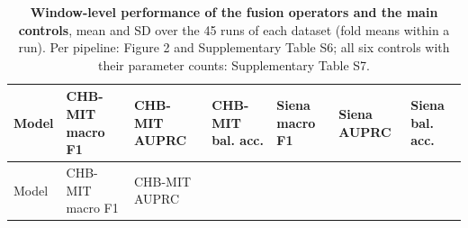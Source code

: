 \documentclass[11pt,a4paper]{article}
\begin{document}
\begin{longtable}[]{@{}
  >{\raggedright\arraybackslash}p{}
  >{\raggedright\arraybackslash}p{}
  >{\raggedright\arraybackslash}p{}
  >{\raggedright\arraybackslash}p{}
  >{\raggedright\arraybackslash}p{}
  >{\raggedright\arraybackslash}p{}
  >{\raggedright\arraybackslash}p{}@{}}
\caption{\textbf{Window-level performance of the fusion operators and the main controls}, mean and SD over the 45 runs of each dataset (fold means within a run). Per pipeline: Figure 2 and Supplementary Table S6; all six controls with their parameter counts: Supplementary Table S7.}\tabularnewline
\toprule\noalign{}
\begin{minipage}[b]{\linewidth}\raggedright
Model
\end{minipage} & \begin{minipage}[b]{\linewidth}\raggedright
CHB-MIT macro F1
\end{minipage} & \begin{minipage}[b]{\linewidth}\raggedright
CHB-MIT AUPRC
\end{minipage} & \begin{minipage}[b]{\linewidth}\raggedright
CHB-MIT bal. acc.
\end{minipage} & \begin{minipage}[b]{\linewidth}\raggedright
Siena macro F1
\end{minipage} & \begin{minipage}[b]{\linewidth}\raggedright
Siena AUPRC
\end{minipage} & \begin{minipage}[b]{\linewidth}\raggedright
Siena bal. acc.
\end{minipage} \\
\midrule\noalign{}
\endfirsthead
\toprule\noalign{}
\begin{minipage}[b]{\linewidth}\raggedright
Model
\end{minipage} & \begin{minipage}[b]{\linewidth}\raggedright
CHB-MIT macro F1
\end{minipage} & \begin{minipage}[b]{\linewidth}\raggedright
CHB-MIT AUPRC
\end{minipage} & \begin{minipage}[b]{\linewidth}\raggedright

\end{minipage}
\end{longtable}
\end{document}
